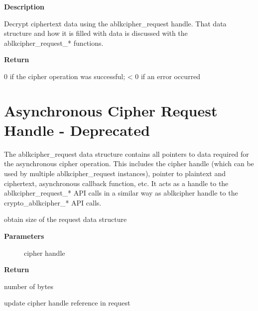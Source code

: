 \documentclass[a4paper,8pt,english]{sphinxmanual}
\begin{document}
\textbf{Description}

Decrypt ciphertext data using the ablkcipher\_request handle. That data
structure and how it is filled with data is discussed with the
ablkcipher\_request\_* functions.

\textbf{Return}

0 if the cipher operation was successful; \textless{} 0 if an error occurred


\section{Asynchronous Cipher Request Handle - Deprecated}
\label{crypto/api-skcipher:asynchronous-cipher-request-handle-deprecated}
The ablkcipher\_request data structure contains all pointers to data
required for the asynchronous cipher operation. This includes the cipher
handle (which can be used by multiple ablkcipher\_request instances), pointer
to plaintext and ciphertext, asynchronous callback function, etc. It acts
as a handle to the ablkcipher\_request\_* API calls in a similar way as
ablkcipher handle to the crypto\_ablkcipher\_* API calls.

\begin{fulllineitems}
\label{crypto/api-skcipher:c.crypto_ablkcipher_reqsize}
obtain size of the request data structure

\end{fulllineitems}


\textbf{Parameters}
\begin{description}
\item[{}] \leavevmode
cipher handle

\end{description}

\textbf{Return}

number of bytes

\begin{fulllineitems}
\label{crypto/api-skcipher:c.ablkcipher_request_set_tfm}
update cipher handle reference in request

\end{fulllineitems}
\end{document}
